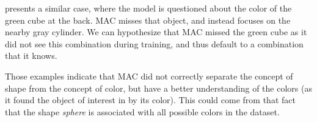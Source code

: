  presents a similar case, where the model is questioned about the color of the green cube at the back. MAC misses that object, and instead focuses on the nearby gray cylinder. We can hypothesize that MAC missed the green cube as it did not see this combination during training, and thus default to a combination that it knows.

Those examples indicate that MAC did not correctly separate the concept of shape from the concept of color, but have a better understanding of the colors (as it found the object of interest in  by its color). This could come from that fact that the shape \textit{sphere} is associated with all possible colors in the dataset. 